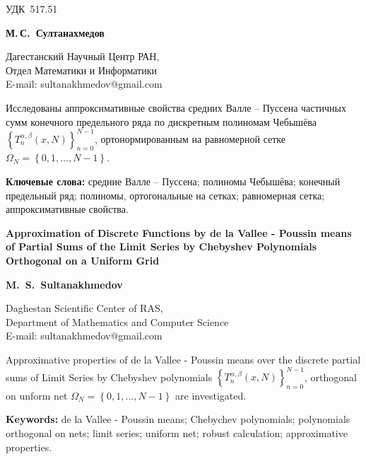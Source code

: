 \documentclass[12pt]{book}
\begin{document}
\vspace*{5mm}


\newpage
\newpage

\noindent\begin{minipage}{160mm}
\noindent\textsf{УДК~517.51}


\textbf{М.\,С.~Султанахмедов}\vspace*{3mm}

Дагестанский Научный Центр РАН,\\
Отдел Математики и Информатики\\
E-mail: sultanakhmedov@gmail.com \vspace*{3mm}

Исследованы аппроксимативные свойства средних Валле -- Пуссена частичных сумм конечного предельного ряда по дискретным полиномам Чебыш\"ева $\left\{ T_n^{\alpha, \beta}(x, N) \right\}_{n=0}^{N-1}$, ортонормированным на равномерной сетке $\Omega_N=\left\{ 0, 1, \ldots, N-1\right\}$.

\vspace*{3mm}

\textbf{Ключевые слова:} средние Валле -- Пуссена; полиномы Чебыш\"ева; конечный предельный ряд; полиномы, ортогональные на сетках; равномерная сетка;  аппроксимативные свойства.\vspace*{3mm}

\textbf{Approximation of Discrete Functions by de la Vallee - Poussin means of Partial Sums of the Limit Series by Chebyshev Polynomials Orthogonal on a Uniform Grid}\vspace*{4pt}

\textbf{M.~S.~Sultanakhmedov}\vspace*{4pt}


Daghestan Scientific Center of RAS,\\
Department of Mathematics and Computer Science\\
E-mail: sultanakhmedov@gmail.com \vspace*{4pt}

Approximative properties of de la Vallee - Poussin means over the discrete partial sums of Limit Series by Chebyshev polynomials  $\left\{ T_n^{\alpha, \beta}(x, N) \right\}_{n=0}^{N-1}$, orthogonal on unform net $\Omega_N=\left\{ 0, 1, \ldots, N-1\right\}$ are investigated.

\textbf{Keywords:} de la Vallee - Poussin means; Chebychev polynomials; polynomials orthogonal on nets; limit series; uniform net; robust calculation; approximative properties.
\end{minipage}
\vspace*{3mm}
\end{document}
